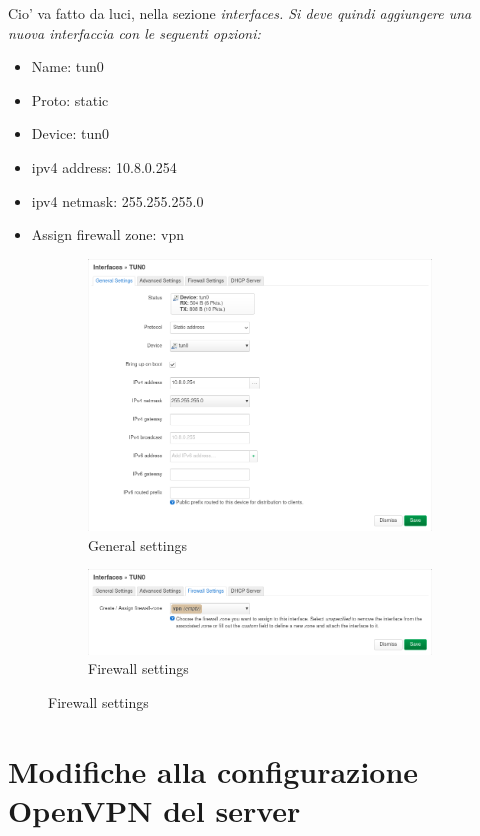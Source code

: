 Cio' va fatto da luci, nella sezione \it{interfaces}. Si deve quindi aggiungere una nuova interfaccia con le seguenti opzioni:
\begin{itemize}
    \item Name: tun0
    \item Proto: static
    \item Device: tun0
    \item ipv4 address: 10.8.0.254
    \item ipv4 netmask: 255.255.255.0
    \item Assign firewall zone: vpn
\end{itemize}

\begin{figure}[H]
    \centering
    \begin{subfigure}{0.9\linewidth}
        \centering
        \includegraphics[width=0.7\linewidth]{immagini/LuCI_int_tun0_1}
        \caption{General settings}
        \label{fig:luci-firewall-interfaces}
    \end{subfigure}

    \begin{subfigure}{0.9\linewidth}
        \centering
        \includegraphics[width=0.7\linewidth]{immagini/LuCI_int_tun0_2}
        \caption{Firewall settings}
        \label{fig:luci-firewall-interfaces1}
    \end{subfigure}
\end{figure}


\section{Modifiche alla configurazione OpenVPN del server}

